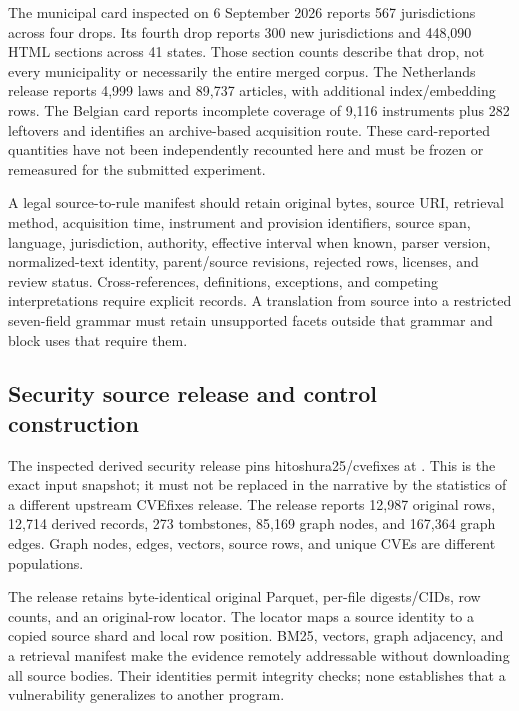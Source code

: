 \documentclass{article}
\begin{document}
The municipal card inspected on 6 September 2026 reports 567 jurisdictions across four drops. Its fourth drop reports 300 new jurisdictions and 448,090 HTML sections across 41 states. Those section counts describe that drop, not every municipality or necessarily the entire merged corpus. The Netherlands release reports 4,999 laws and 89,737 articles, with additional index/embedding rows. The Belgian card reports incomplete coverage of 9,116 instruments plus 282 leftovers and identifies an archive-based acquisition route. These card-reported quantities have not been independently recounted here and must be frozen or remeasured for the submitted experiment.

A legal source-to-rule manifest should retain original bytes, source URI, retrieval method, acquisition time, instrument and provision identifiers, source span, language, jurisdiction, authority, effective interval when known, parser version, normalized-text identity, parent/source revisions, rejected rows, licenses, and review status. Cross-references, definitions, exceptions, and competing interpretations require explicit records. A translation from source into a restricted seven-field grammar must retain unsupported facets outside that grammar and block uses that require them.

\subsection{Security source release and control construction}

The inspected derived security release pins hitoshura25/cvefixes at . This is the exact input snapshot; it must not be replaced in the narrative by the statistics of a different upstream CVEfixes release. The release reports 12,987 original rows, 12,714 derived records, 273 tombstones, 85,169 graph nodes, and 167,364 graph edges. Graph nodes, edges, vectors, source rows, and unique CVEs are different populations.

The release retains byte-identical original Parquet, per-file digests/CIDs, row counts, and an original-row locator. The locator maps a source identity to a copied source shard and local row position. BM25, vectors, graph adjacency, and a retrieval manifest make the evidence remotely addressable without downloading all source bodies. Their identities permit integrity checks; none establishes that a vulnerability generalizes to another program.
\end{document}
